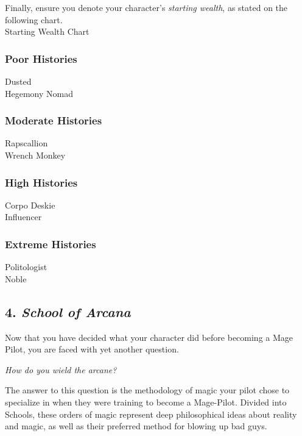 \documentclass[
]{article}
\begin{document}
Finally, ensure you denote your character's \emph{starting wealth}, as
stated on the following chart.\\
{Starting Wealth Chart}

\hypertarget{poor-histories}{%
\subsubsection{Poor Histories}\label{poor-histories}}

{Dusted}\\
{Hegemony Nomad}

\hypertarget{moderate-histories}{%
\subsubsection{Moderate Histories}\label{moderate-histories}}

{Rapscallion}\\
{Wrench Monkey}

\hypertarget{high-histories}{%
\subsubsection{High Histories}\label{high-histories}}

{Corpo Deskie}\\
{Influencer}

\hypertarget{extreme-histories}{%
\subsubsection{Extreme Histories}\label{extreme-histories}}

{Politologist}\\
{Noble}

\hypertarget{school-of-arcana}{%
\subsection{\texorpdfstring{4. \emph{School of
Arcana}}{4. School of Arcana}}\label{school-of-arcana}}

Now that you have decided what your character did before becoming a Mage
Pilot, you are faced with yet another question.

\emph{How do you wield the arcane?}

The answer to this question is the methodology of magic your pilot chose
to specialize in when they were training to become a Mage-Pilot. Divided
into Schools, these orders of magic represent deep philosophical ideas
about reality and magic, as well as their preferred method for blowing
up bad guys.
\end{document}
